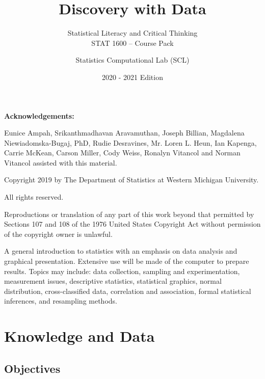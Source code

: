 \documentclass[11pt, chapterprefix=true]{scrbook}\usepackage[]{graphicx}\usepackage[]{color}
\title{{\Huge{Discovery with Data}}}
\subtitle{{\Large{Statistical Literacy and Critical Thinking \\ STAT 1600 -- Course Pack}}}
\author{Statistics Computational Lab (SCL)}
\date{2020 - 2021 Edition}  %
\begin{document}
\maketitle


\begin{center} \textbf{Acknowledgements:}
\end{center}

Eunice Ampah, Srikanthmadhavan Aravamuthan, Joseph Billian, Magdalena Niewiadomska-Bugaj, PhD, Rudie Desravines, Mr. Loren L. Heun, Ian Kapenga, Carrie McKean, Carson Miller, Cody Weiss, Ronalyn Vitancol and Norman Vitancol assisted with  this material.

\vspace{11cm}

Copyright 2019 by The Department of Statistics at Western Michigan University.

All rights reserved.

Reproductions or translation of any part of this work beyond that permitted by Sections 107 and 108 of the 1976 United States Copyright Act without permission of the copyright owner is unlawful.

A general introduction to statistics with an emphasis on data analysis and graphical presentation. Extensive use will be made of the computer to prepare results. Topics may include: data collection, sampling and experimentation, measurement issues, descriptive statistics, statistical graphics, normal distribution, cross-classified data, correlation and association, formal statistical inferences, and resampling methods.

\overfullrule=1cm

\tableofcontents




\chapter{Knowledge and Data}
\label{chap:ch1}

\section{Objectives}
\end{document}
